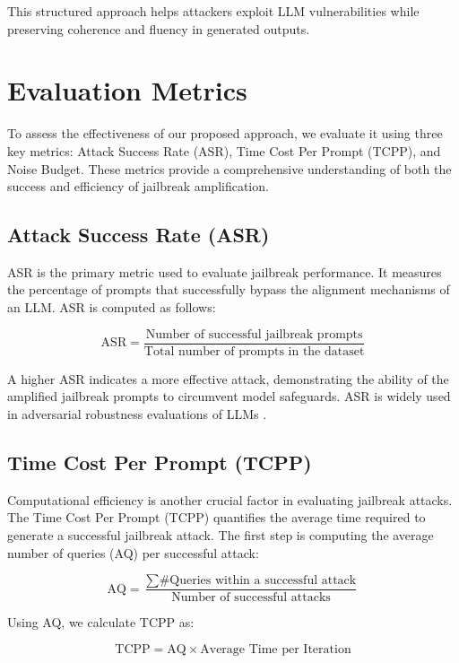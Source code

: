 This structured approach helps attackers exploit LLM vulnerabilities while preserving coherence and fluency in generated outputs.



\section{Evaluation Metrics}
\label{appendix: Evaluation Metrics}

To assess the effectiveness of our proposed approach, we evaluate it using three key metrics: Attack Success Rate (ASR), Time Cost Per Prompt (TCPP), and Noise Budget. These metrics provide a comprehensive understanding of both the success and efficiency of jailbreak amplification.

\subsection{Attack Success Rate (ASR)}
ASR is the primary metric used to evaluate jailbreak performance. It measures the percentage of prompts that successfully bypass the alignment mechanisms of an LLM. ASR is computed as follows:

\[
\text{ASR} = \frac{ \text{Number of successful jailbreak prompts}}{\text{Total number of prompts in the dataset}}
\]

A higher ASR indicates a more effective attack, demonstrating the ability of the amplified jailbreak prompts to circumvent model safeguards. ASR is widely used in adversarial robustness evaluations of LLMs \cite{perez2022ignore, greshake2023not}.

\subsection{Time Cost Per Prompt (TCPP)}
\label{sebsec: TCPP experiment}
Computational efficiency is another crucial factor in evaluating jailbreak attacks. The Time Cost Per Prompt (TCPP) quantifies the average time required to generate a successful jailbreak attack. The first step is computing the average number of queries (AQ) per successful attack:

\[
\text{AQ} = \frac{\sum \text{\#Queries within a successful attack}}{\text{Number of successful attacks}}
\]

Using AQ, we calculate TCPP as:

\[
\text{TCPP} = \text{AQ} \times \text{Average Time per Iteration}
\]

